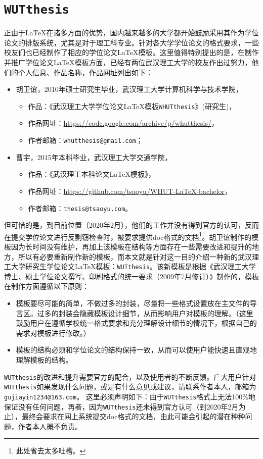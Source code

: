 \section{\texttt{WUTthesis}}



\par 正由于{\LaTeX}在诸多方面的优势，国内越来越多的大学都开始鼓励采用其作为学位论文的排版系统，尤其是对于理工科专业。针对各大学学位论文的格式要求，一些校友们也已经制作了相应的学位论文{\LaTeX}模板。这里值得特别提出的是，在制作并推广学位论文{\LaTeX}模板方面，已经有两位武汉理工大学的校友作出过努力，他们的个人信息、作品名称，作品网址列出如下：
\begin{itemize}
\item 胡卫谊，2010年硕士研究生毕业，武汉理工大学计算机科学与技术学院，
\begin{itemize}
\item 作品：《武汉理工大学学位论文{\LaTeX}模板\texttt{WHUTthesis}》(研究生)，
\item 作品网址：\url{https://code.google.com/archive/p/whutthesis/}，
\item 作者邮箱：\texttt{whutthesis@gmail.com}；
\end{itemize}
\item 曹宇，2015年本科毕业，武汉理工大学交通学院，
\begin{itemize}
\item 作品：《武汉理工本科论文{\LaTeX}模板》，
\item 作品网址：\url{https://github.com/tsaoyu/WHUT-LaTeX-bachelor}，
\item 作者邮箱：\texttt{thesis@tsaoyu.com}。
\end{itemize}
\end{itemize}
但可惜的是，到目前位置（2020年2月），他们的工作并没有得到官方的认可，反而在提交学位论文进行反剽窃检查时，被要求提供doc格式的文档\footnote{此处省去太多吐槽。}。胡卫谊制作的模板因为长时间没有维护，再加上该模板在结构等方面存在一些需要改进和提升的地方，所以有必要重新制作新的模板，而本文就是针对这一目的介绍一种新的武汉理工大学研究生学位论文{\LaTeX}模板：\texttt{WUTthesis}。该新模板是根据《武汉理工大学博士、硕士学位论文撰写、印刷格式的统一要求（2009年7月修订）》制作的，模板在制作方面遵循以下原则：
\begin{itemize}
\item 模板要尽可能的简单，不做过多的封装，尽量将一些格式设置放在主文件的导言区。过多的封装会隐藏模板设计细节，从而影响用户对模板的理解。（这里鼓励用户在遵循学校统一格式要求和充分理解设计细节的情况下，根据自己的需求对模板进行修改。）
\item 模板的结构必须和学位论文的结构保持一致，从而可以使用户能快速且直观地理解模板的结构。
\end{itemize}


\par \texttt{WUTthesis}的改进和提升需要官方的配合，以及使用者的不断反馈。广大用户针对\texttt{WUTthesis}如果发现什么问题，或是有什么意见或建议，请联系作者本人，邮箱为\texttt{gujiayin1234@163.com}。{\color{red} 这里必须声明如下：由于\texttt{WUTthesis}格式上无法100\%地保证没有任何问题，再者，因为\texttt{WUTthesis}还未得到官方认可（到2020年2月为止），最终会要求在网上系统提交doc格式的文档，由此可能会引起的潜在种种问题，作者本人概不负责。}


